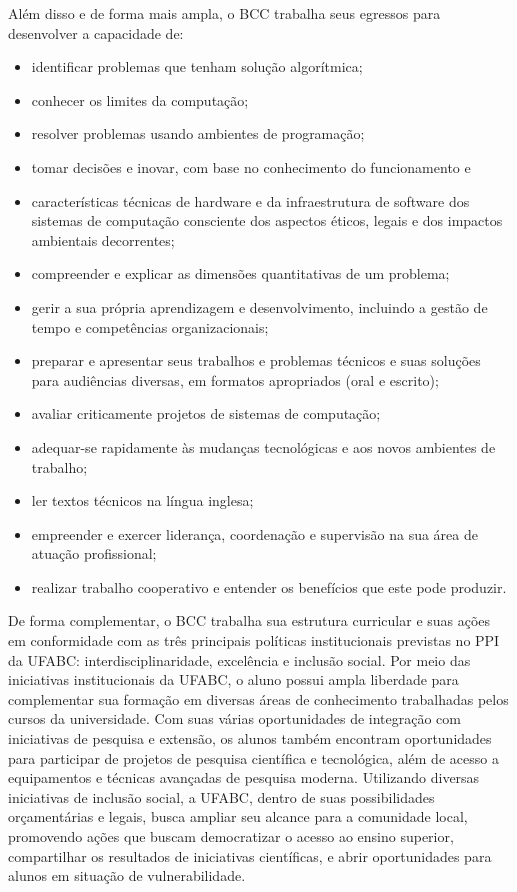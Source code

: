     Além disso e de forma mais ampla, o BCC trabalha seus egressos para desenvolver a capacidade de: 
\begin{itemize}
	\item identificar problemas que tenham solução algorítmica;
	\item conhecer os limites da computação;
	\item resolver problemas usando ambientes de programação;
	\item tomar decisões e inovar, com base no conhecimento do funcionamento e
	\item características técnicas de hardware e da infraestrutura de software dos sistemas de computação consciente dos aspectos éticos, legais e dos impactos ambientais decorrentes;
	\item compreender e explicar as dimensões quantitativas de um problema;
	\item gerir a sua própria aprendizagem e desenvolvimento, incluindo a gestão de tempo e competências organizacionais;
	\item preparar e apresentar seus trabalhos e problemas técnicos e suas soluções para audiências diversas, em formatos apropriados (oral e escrito);
	\item avaliar criticamente projetos de sistemas de computação;
	\item adequar-se rapidamente às mudanças tecnológicas e aos novos ambientes de trabalho;
	\item ler textos técnicos na língua inglesa;
	\item empreender e exercer liderança, coordenação e supervisão na sua área de atuação profissional;
	\item realizar trabalho cooperativo e entender os benefícios que este pode produzir.
	
\end{itemize}


De forma complementar, o BCC trabalha sua estrutura curricular e suas ações em conformidade com as três principais políticas institucionais previstas no PPI da UFABC: interdisciplinaridade, excelência e inclusão social. Por meio das iniciativas institucionais da UFABC, o aluno possui ampla liberdade para complementar sua formação em diversas áreas de conhecimento trabalhadas pelos cursos da universidade. Com suas várias oportunidades de integração com iniciativas de pesquisa e extensão, os alunos também encontram oportunidades para participar de projetos de pesquisa científica e tecnológica, além de acesso a equipamentos e técnicas avançadas de pesquisa moderna. Utilizando diversas iniciativas de inclusão social, a UFABC, dentro de suas possibilidades orçamentárias e legais, busca ampliar seu alcance para a comunidade local, promovendo ações que buscam democratizar o acesso ao ensino superior, compartilhar os resultados de iniciativas científicas, e abrir oportunidades para alunos em situação de vulnerabilidade.

